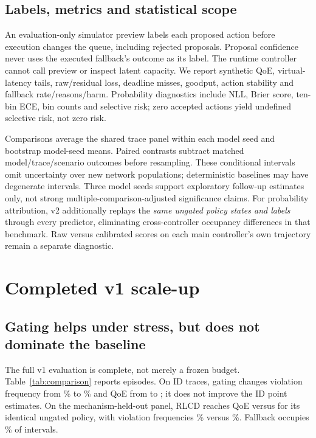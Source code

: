 \documentclass[10pt]{article}
\begin{document}
\subsection{Labels, metrics and statistical scope}
An evaluation-only simulator preview labels each proposed action before execution changes the queue, including rejected proposals. Proposal confidence never uses the executed fallback's outcome as its label. The runtime controller cannot call preview or inspect latent capacity. We report synthetic QoE, virtual-latency tails, raw/residual loss, deadline misses, goodput, action stability and fallback rate/reasons/harm. Probability diagnostics include NLL, Brier score, ten-bin ECE, bin counts and selective risk; zero accepted actions yield undefined selective risk, not zero risk.

Comparisons average the shared trace panel within each model seed and bootstrap model-seed means. Paired contrasts subtract matched model/trace/scenario outcomes before resampling. These conditional intervals omit uncertainty over new network populations; deterministic baselines may have degenerate intervals. Three model seeds support exploratory follow-up estimates only, not strong multiple-comparison-adjusted significance claims. For probability attribution, v2 additionally replays the \emph{same ungated policy states and labels} through every predictor, eliminating cross-controller occupancy differences in that benchmark. Raw versus calibrated scores on each main controller's own trajectory remain a separate diagnostic.

\section{Completed v1 scale-up}
\subsection{Gating helps under stress, but does not dominate the baseline}
The full v1 evaluation is complete, not merely a frozen budget. Table~\ref{tab:comparison} reports \EvidenceNumEpisodes{} episodes. On ID traces, gating changes violation frequency from \EvidenceIDRLUnsafePct\% to \EvidenceIDRLCDUnsafePct\% and QoE from \EvidenceIDRLQoE{} to \EvidenceIDRLCDQoE{}; it does not improve the ID point estimates. On the mechanism-held-out panel, RLCD reaches QoE \EvidenceOODRLCDQoE{} versus \EvidenceOODRLQoE{} for its identical ungated policy, with violation frequencies \EvidenceOODRLCDUnsafePct\% versus \EvidenceOODRLUnsafePct\%. Fallback occupies \EvidenceOODRLCDFallbackPct\% of intervals.
\end{document}

